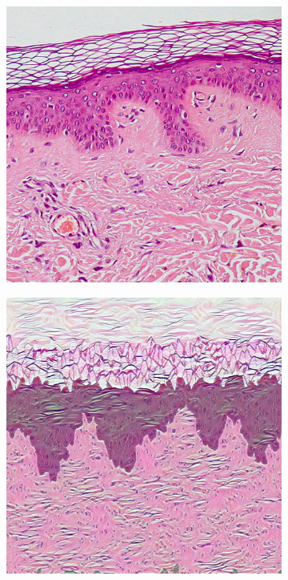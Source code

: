 \begin{description}
\begin{figure}
\begin{subfigure}[t]{0.3\textwidth}
                 \includegraphics[width = \textwidth]{images/st_nn5}
                 \caption{}
                 \label{fig:st_nn5}
            \end{subfigure}
            \quad
            \begin{subfigure}[t]{0.3\textwidth}
                 \centering
                 \includegraphics[width = \textwidth]{images/st_nn6}

\end{subfigure}
\end{figure}
\end{description}
